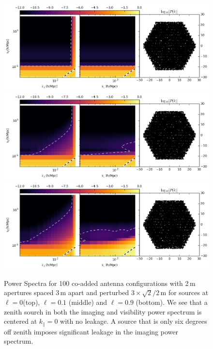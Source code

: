 \documentclass[a4paper,fleqn,usenatbib]{mnras}
\begin{document}
\begin{figure}
\includegraphics[width=\textwidth]{power_spectrum_zenith_hex_217_dAnt_2_dAntPos_3_perturbedHex_100config.png}
\includegraphics[width=\textwidth]{power_spectrum_offcenterleast_hex_217_dAnt_2_dAntPos_3_perturbedHex_100config.png}
\includegraphics[width=\textwidth]{power_spectrum_hex_217_dAnt_2_dAntPos_3_perturbedHex_100config.png}
\caption{Power Spectra for 100 co-added antenna configurations with 2\,m apertures spaced 3\,m apart and perturbed $3 \times \sqrt{2}/2$\,m for sources at $\ell = 0$(top), $\ell=0.1$ (middle) and $\ell=0.9$ (bottom). We see that a zenith sourch in both the imaging and visibility power spectrum is centered at $k_\parallel=0$ with no leakage. A source that is only six degrees off zenith imposes significant leakage in the imaging power spectrum.}
\label{fig:PowerSpectrumPerturbDefault_DiffPositions}
\end{figure}
\end{document}
